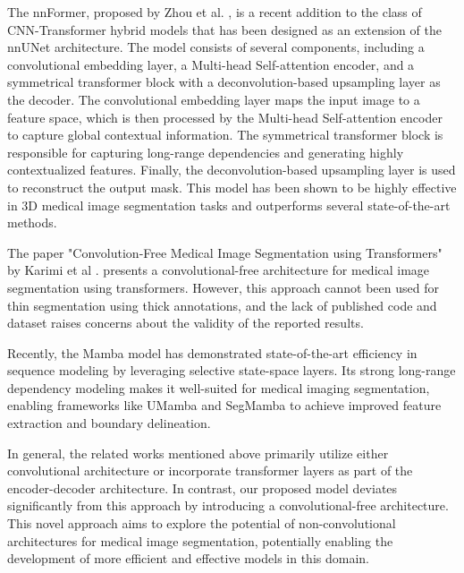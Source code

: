 The nnFormer, proposed by Zhou et al. \cite{23}, is a recent addition to the class of CNN-Transformer hybrid models that has been designed as an extension of the nnUNet architecture. The model consists of several components, including a convolutional embedding layer, a Multi-head Self-attention encoder, and a symmetrical transformer block with a deconvolution-based upsampling layer as the decoder. The convolutional embedding layer maps the input image to a feature space, which is then processed by the Multi-head Self-attention encoder to capture global contextual information. The symmetrical transformer block is responsible for capturing long-range dependencies and generating highly contextualized features. Finally, the deconvolution-based upsampling layer is used to reconstruct the output mask. This model has been shown to be highly effective in 3D medical image segmentation tasks and outperforms several state-of-the-art methods.

The paper "Convolution-Free Medical Image Segmentation using Transformers" by Karimi et al \cite{30}. presents a convolutional-free architecture for medical image segmentation using transformers. However, this approach cannot been used for thin segmentation using thick annotations, and the lack of published code and dataset raises concerns about the validity of the reported results.

Recently, the Mamba model \cite{zhang2024infinimotion,zhang2024kmm,zhang2024motion} has demonstrated state-of-the-art efficiency in sequence modeling by leveraging selective state-space layers. Its strong long-range dependency modeling makes it well-suited for medical imaging segmentation, enabling frameworks like UMamba and SegMamba to achieve improved feature extraction and boundary delineation.

In general, the related works mentioned above primarily utilize either convolutional architecture or incorporate transformer layers as part of the encoder-decoder architecture. In contrast, our proposed model deviates significantly from this approach by introducing a convolutional-free architecture. This novel approach aims to explore the potential of non-convolutional architectures for medical image segmentation, potentially enabling the development of more efficient and effective models in this domain.
